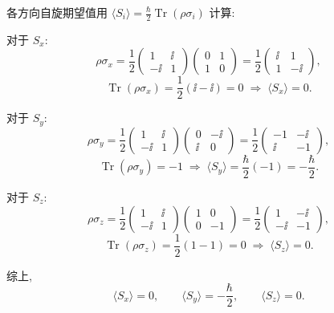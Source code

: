 \begin{question}
\begin{solution}
各方向自旋期望值用 $\langle S_i\rangle = \frac{\hbar}{2}\operatorname{Tr}(\rho\sigma_i)$ 计算:

对于 $S_x$:
\[
\rho\sigma_x = \frac{1}{2}\begin{pmatrix}1&\ii\\-\ii&1\end{pmatrix}\begin{pmatrix}0&1\\1&0\end{pmatrix}
= \frac{1}{2}\begin{pmatrix}\ii&1\\1&-\ii\end{pmatrix},
\]
\[
\operatorname{Tr}(\rho\sigma_x) = \frac{1}{2}(\ii - \ii) = 0
\;\Longrightarrow\; \langle S_x\rangle = 0.
\]

对于 $S_y$:
\[
\rho\sigma_y = \frac{1}{2}\begin{pmatrix}1&\ii\\-\ii&1\end{pmatrix}\begin{pmatrix}0&-\ii\\\ii&0\end{pmatrix}
= \frac{1}{2}\begin{pmatrix}-1&-\ii\\\ii&-1\end{pmatrix},
\]
\[
\operatorname{Tr}(\rho\sigma_y) = -1
\;\Longrightarrow\; \langle S_y\rangle = \frac{\hbar}{2}(-1) = -\frac{\hbar}{2}.
\]

对于 $S_z$:
\[
\rho\sigma_z = \frac{1}{2}\begin{pmatrix}1&\ii\\-\ii&1\end{pmatrix}\begin{pmatrix}1&0\\0&-1\end{pmatrix}
= \frac{1}{2}\begin{pmatrix}1&-\ii\\-\ii&-1\end{pmatrix},
\]
\[
\operatorname{Tr}(\rho\sigma_z) = \frac{1}{2}(1-1) = 0
\;\Longrightarrow\; \langle S_z\rangle = 0.
\]

综上,
\[
\boxed{\langle S_x\rangle = 0,\qquad \langle S_y\rangle = -\frac{\hbar}{2},\qquad \langle S_z\rangle = 0.}
\]


\end{solution}
\end{question}
